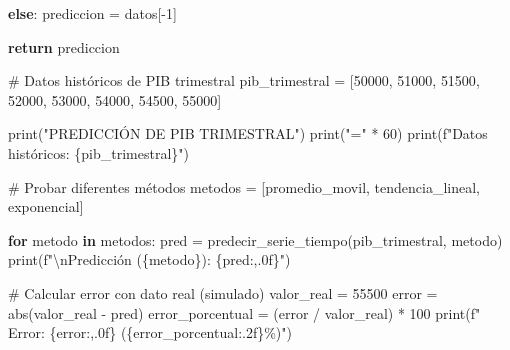 \documentclass[
  doc,
  floatsintext,
  longtable,
  a4paper,
  nolmodern,
  notxfonts,
  notimes,
  12pt,
  colorlinks=true,linkcolor=blue,citecolor=blue,urlcolor=blue]{apa7}
\newenvironment{Shaded}{\begin{snugshade}}{\end{snugshade}}
\newcommand{\BuiltInTok}[1]{\textcolor[rgb]{0.00,0.23,0.31}{#1}}
\newcommand{\CharTok}[1]{\textcolor[rgb]{0.13,0.47,0.30}{#1}}
\newcommand{\CommentTok}[1]{\textcolor[rgb]{0.37,0.37,0.37}{#1}}
\newcommand{\ControlFlowTok}[1]{\textcolor[rgb]{0.00,0.23,0.31}{\textbf{#1}}}
\newcommand{\DecValTok}[1]{\textcolor[rgb]{0.68,0.00,0.00}{#1}}
\newcommand{\KeywordTok}[1]{\textcolor[rgb]{0.00,0.23,0.31}{\textbf{#1}}}
\newcommand{\NormalTok}[1]{\textcolor[rgb]{0.00,0.23,0.31}{#1}}
\newcommand{\OperatorTok}[1]{\textcolor[rgb]{0.37,0.37,0.37}{#1}}
\newcommand{\SpecialCharTok}[1]{\textcolor[rgb]{0.37,0.37,0.37}{#1}}
\newcommand{\SpecialStringTok}[1]{\textcolor[rgb]{0.13,0.47,0.30}{#1}}
\newcommand{\StringTok}[1]{\textcolor[rgb]{0.13,0.47,0.30}{#1}}
\begin{document}
\begin{Shaded}
\begin{Highlighting}[]
    \ControlFlowTok{else}\NormalTok{:}
\NormalTok{        prediccion }\OperatorTok{=}\NormalTok{ datos[}\OperatorTok{{-}}\DecValTok{1}\NormalTok{]}
    
    \ControlFlowTok{return}\NormalTok{ prediccion}

\CommentTok{\# Datos históricos de PIB trimestral}
\NormalTok{pib\_trimestral }\OperatorTok{=}\NormalTok{ [}\DecValTok{50000}\NormalTok{, }\DecValTok{51000}\NormalTok{, }\DecValTok{51500}\NormalTok{, }\DecValTok{52000}\NormalTok{, }\DecValTok{53000}\NormalTok{, }\DecValTok{54000}\NormalTok{, }\DecValTok{54500}\NormalTok{, }\DecValTok{55000}\NormalTok{]}

\BuiltInTok{print}\NormalTok{(}\StringTok{"PREDICCIÓN DE PIB TRIMESTRAL"}\NormalTok{)}
\BuiltInTok{print}\NormalTok{(}\StringTok{"="} \OperatorTok{*} \DecValTok{60}\NormalTok{)}
\BuiltInTok{print}\NormalTok{(}\SpecialStringTok{f"Datos históricos: }\SpecialCharTok{\{}\NormalTok{pib\_trimestral}\SpecialCharTok{\}}\SpecialStringTok{"}\NormalTok{)}

\CommentTok{\# Probar diferentes métodos}
\NormalTok{metodos }\OperatorTok{=}\NormalTok{ [}\StringTok{\textquotesingle{}promedio\_movil\textquotesingle{}}\NormalTok{, }\StringTok{\textquotesingle{}tendencia\_lineal\textquotesingle{}}\NormalTok{, }\StringTok{\textquotesingle{}exponencial\textquotesingle{}}\NormalTok{]}

\ControlFlowTok{for}\NormalTok{ metodo }\KeywordTok{in}\NormalTok{ metodos:}
\NormalTok{    pred }\OperatorTok{=}\NormalTok{ predecir\_serie\_tiempo(pib\_trimestral, metodo)}
    \BuiltInTok{print}\NormalTok{(}\SpecialStringTok{f"}\CharTok{\textbackslash{}n}\SpecialStringTok{Predicción (}\SpecialCharTok{\{}\NormalTok{metodo}\SpecialCharTok{\}}\SpecialStringTok{): }\SpecialCharTok{\{}\NormalTok{pred}\SpecialCharTok{:,.0f\}}\SpecialStringTok{"}\NormalTok{)}
    
    \CommentTok{\# Calcular error con dato real (simulado)}
\NormalTok{    valor\_real }\OperatorTok{=} \DecValTok{55500}
\NormalTok{    error }\OperatorTok{=} \BuiltInTok{abs}\NormalTok{(valor\_real }\OperatorTok{{-}}\NormalTok{ pred)}
\NormalTok{    error\_porcentual }\OperatorTok{=}\NormalTok{ (error }\OperatorTok{/}\NormalTok{ valor\_real) }\OperatorTok{*} \DecValTok{100}
    \BuiltInTok{print}\NormalTok{(}\SpecialStringTok{f"  Error: }\SpecialCharTok{\{}\NormalTok{error}\SpecialCharTok{:,.0f\}}\SpecialStringTok{ (}\SpecialCharTok{\{}\NormalTok{error\_porcentual}\SpecialCharTok{:.2f\}}\SpecialStringTok{\%)"}\NormalTok{)}
\end{Highlighting}
\end{Shaded}
\end{document}

